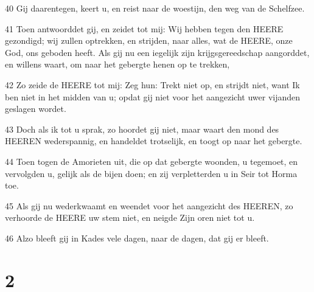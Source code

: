 \par 40 Gij daarentegen, keert u, en reist naar de woestijn, den weg van de Schelfzee.
\par 41 Toen antwoorddet gij, en zeidet tot mij: Wij hebben tegen den HEERE gezondigd; wij zullen optrekken, en strijden, naar alles, wat de HEERE, onze God, ons geboden heeft. Als gij nu een iegelijk zijn krijgsgereedschap aangorddet, en willens waart, om naar het gebergte henen op te trekken,
\par 42 Zo zeide de HEERE tot mij: Zeg hun: Trekt niet op, en strijdt niet, want Ik ben niet in het midden van u; opdat gij niet voor het aangezicht uwer vijanden geslagen wordet.
\par 43 Doch als ik tot u sprak, zo hoordet gij niet, maar waart den mond des HEEREN wederspannig, en handeldet trotselijk, en toogt op naar het gebergte.
\par 44 Toen togen de Amorieten uit, die op dat gebergte woonden, u tegemoet, en vervolgden u, gelijk als de bijen doen; en zij verpletterden u in Seir tot Horma toe.
\par 45 Als gij nu wederkwaamt en weendet voor het aangezicht des HEEREN, zo verhoorde de HEERE uw stem niet, en neigde Zijn oren niet tot u.
\par 46 Alzo bleeft gij in Kades vele dagen, naar de dagen, dat gij er bleeft.

\chapter{2}

